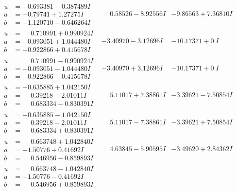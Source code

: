 \documentclass[1p]{elsarticle_modified}
\theoremstyle{definition}
\begin{document}
$$\begin{array}{c|c|c}
\begin{aligned}
u &= -0.693381 - 0.387489 I \\
a &= -0.79741 + 1.27275 I \\
b &= -1.120710 - 0.646264 I\end{aligned}
 & \phantom{-}0.58526 - 8.92556 I & -9.86563 + 7.36810 I \\ \hline\begin{aligned}
u &= \phantom{-}0.710991 + 0.990924 I \\
a &= -0.093051 + 1.044480 I \\
b &= -0.922866 + 0.415678 I\end{aligned}
 & -3.40970 - 3.12696 I & -10.17371 + 0. I\phantom{ +0.000000I} \\ \hline\begin{aligned}
u &= \phantom{-}0.710991 - 0.990924 I \\
a &= -0.093051 - 1.044480 I \\
b &= -0.922866 - 0.415678 I\end{aligned}
 & -3.40970 + 3.12696 I & -10.17371 + 0. I\phantom{ +0.000000I} \\ \hline\begin{aligned}
u &= -0.635885 + 1.042150 I \\
a &= \phantom{-}0.39218 + 2.01011 I \\
b &= \phantom{-}0.683334 - 0.830391 I\end{aligned}
 & \phantom{-}5.11017 + 7.38861 I & -3.39621 - 7.50854 I \\ \hline\begin{aligned}
u &= -0.635885 - 1.042150 I \\
a &= \phantom{-}0.39218 - 2.01011 I \\
b &= \phantom{-}0.683334 + 0.830391 I\end{aligned}
 & \phantom{-}5.11017 - 7.38861 I & -3.39621 + 7.50854 I \\ \hline\begin{aligned}
u &= \phantom{-}0.663748 + 1.042840 I \\
a &= -1.50776 + 0.41692 I \\
b &= \phantom{-}0.546956 - 0.859893 I\end{aligned}
 & \phantom{-}4.63845 - 5.90595 I & -3.49620 + 2.84362 I \\ \hline\begin{aligned}
u &= \phantom{-}0.663748 - 1.042840 I \\
a &= -1.50776 - 0.41692 I \\
b &= \phantom{-}0.546956 + 0.859893 I\end{aligned}

\end{array}$$
\end{document}
